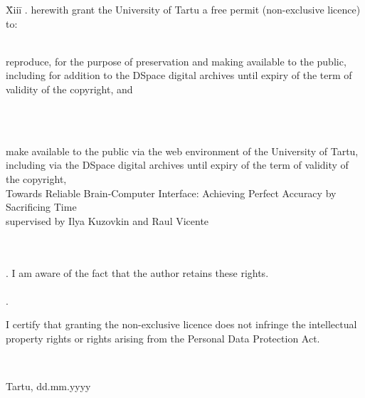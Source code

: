 \documentclass[12pt]{article}
\theoremstyle{definition}
\begin{document}
\begin{tabbing}
\= Xiii\=\kill
{}. \> herewith grant the University of Tartu a free permit (non-exclusive licence) to:\\\\ 

\> 
\begin{minipage}[t]{14.2cm}
reproduce, for the purpose of preservation and making available to the public, including for addition to the DSpace digital archives until expiry of the term of validity of the copyright, and
\end{minipage}
\\\\
\begin{minipage}[t]{14.2cm}
make available to the public via the web environment of the University of Tartu, including via the DSpace digital archives until expiry of the term of validity of the copyright,\\ 

Towards Reliable Brain-Computer Interface: Achieving Perfect Accuracy by Sacrificing Time\\   

supervised by Ilya Kuzovkin and Raul Vicente

\end{minipage}\\\\ 
. \>I am aware of the fact that the author retains these rights.\\\\
. \>
\begin{minipage}[t]{14.2cm}
I certify that granting the non-exclusive licence does not infringe the intellectual property rights or rights arising from the Personal Data Protection Act. 
\end{minipage}\\
\end{tabbing}

\noindent
Tartu, dd.mm.yyyy
\end{document}
